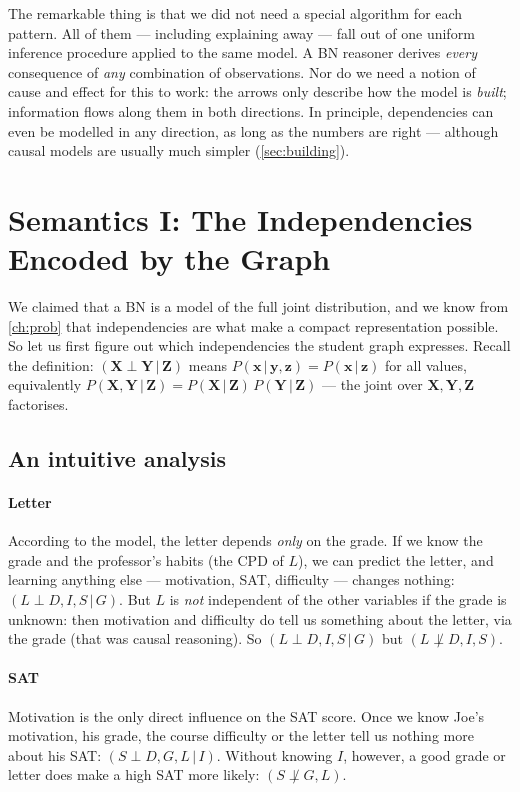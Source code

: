 \documentclass[11pt, oneside]{book}
\newcommand{\Prob}{\mathbb{P}}           %
\newcommand{\given}{\,\vert\,}           %
\newcommand{\indep}{\perp}               %
\newcommand{\nindep}{\not\perp}          %
\newcommand{\bX}{\mathbf{X}}  \newcommand{\bY}{\mathbf{Y}}
\newcommand{\bZ}{\mathbf{Z}}  \newcommand{\bE}{\mathbf{E}}
\newcommand{\bx}{\mathbf{x}}  \newcommand{\by}{\mathbf{y}}
\newcommand{\bz}{\mathbf{z}}  \newcommand{\be}{\mathbf{e}}
\let\originalsection\section
\renewcommand{\section}{\Needspace{7\baselineskip}\originalsection}
\let\originalsubsection\subsection
\renewcommand{\subsection}{\Needspace{6\baselineskip}\originalsubsection}
\begin{document}
The remarkable thing is that we did not need a special algorithm for each
pattern. All of them --- including explaining away --- fall out of one
uniform inference procedure applied to the same model. A BN reasoner derives
\emph{every} consequence of \emph{any} combination of observations. Nor do we
need a notion of cause and effect for this to work: the arrows only describe
how the model is \emph{built}; information flows along them in both
directions. In principle, dependencies can even be modelled in any direction,
as long as the numbers are right --- although causal models are usually much
simpler (\cref{sec:building}).

\section{Semantics I: The Independencies Encoded by the Graph}
\label{sec:bn-indep}

We claimed that a BN is a model of the full joint distribution, and we know
from \cref{ch:prob} that independencies are what make a compact
representation possible. So let us first figure out which independencies the
student graph expresses. Recall the definition:
$(\bX \indep \bY \given \bZ)$ means $P(\bx \given \by, \bz) = P(\bx \given \bz)$
for all values, equivalently $P(\bX, \bY \given \bZ) = P(\bX \given \bZ)\,
P(\bY \given \bZ)$ --- the joint over $\bX, \bY, \bZ$ factorises.

\subsection{An intuitive analysis}

\paragraph{Letter} According to the model, the letter depends \emph{only} on
the grade. If we know the grade and the professor's habits (the CPD of $L$),
we can predict the letter, and learning anything else --- motivation, SAT,
difficulty --- changes nothing:
$(L \indep D, I, S \given G)$. But $L$ is \emph{not} independent of the other
variables if the grade is unknown: then motivation and difficulty do tell us
something about the letter, via the grade (that was causal reasoning). So
$(L \indep D, I, S \given G)$ but $(L \nindep D, I, S)$.

\paragraph{SAT} Motivation is the only direct influence on the SAT score. Once
we know Joe's motivation, his grade, the course difficulty or the letter tell
us nothing more about his SAT: $(S \indep D, G, L \given I)$. Without knowing
$I$, however, a good grade or letter does make a high SAT more likely:
$(S \nindep G, L)$.
\end{document}
